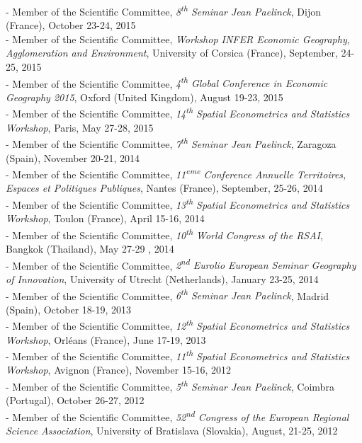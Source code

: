 \documentclass[a4paper,12pt]{article}
\begin{document}
- Member of the Scientific Committee, \textit{8\textsuperscript{th} Seminar Jean Paelinck}, Dijon (France), October 23-24, 2015 \\
- Member of the Scientific Committee, \textit{Workshop INFER Economic Geography, Agglomeration and Environment}, University of Corsica (France), September, 24-25, 2015 \\
- Member of the Scientific Committee, \textit{4\textsuperscript{th} Global Conference in Economic Geography 2015}, Oxford (United Kingdom), August 19-23, 2015 \\
- Member of the Scientific Committee, \textit{14\textsuperscript{th} Spatial Econometrics and Statistics Workshop}, Paris, May 27-28, 2015 \\
- Member of the Scientific Committee, \textit{7\textsuperscript{th} Seminar Jean Paelinck}, Zaragoza (Spain), November 20-21, 2014 \\
- Member of the Scientific Committee, \textit{11\textsuperscript{eme} Conference Annuelle Territoires, Espaces et Politiques Publiques}, Nantes (France), September, 25-26, 2014 \\
- Member of the Scientific Committee, \textit{13\textsuperscript{th} Spatial Econometrics and Statistics Workshop}, Toulon (France), April 15-16, 2014 \\
- Member of the Scientific Committee, \textit{10\textsuperscript{th} World Congress of the RSAI}, Bangkok (Thailand), May 27-29 , 2014\\
- Member of the Scientific Committee, \textit{2\textsuperscript{nd} Eurolio European Seminar Geography of Innovation}, University of Utrecht (Netherlands), January 23-25, 2014 \\
- Member of the Scientific Committee, \textit{6\textsuperscript{th} Seminar Jean Paelinck}, Madrid (Spain), October 18-19, 2013 \\
- Member of the Scientific Committee, \textit{12\textsuperscript{th} Spatial Econometrics and Statistics Workshop}, Orléans (France), June 17-19, 2013 \\
- Member of the Scientific Committee, \textit{11\textsuperscript{th} Spatial Econometrics and Statistics Workshop}, Avignon (France), November 15-16, 2012 \\
- Member of the Scientific Committee, \textit{5\textsuperscript{th} Seminar Jean Paelinck}, Coimbra (Portugal), October 26-27, 2012 \\
- Member of the Scientific Committee, \textit{52\textsuperscript{nd} Congress of the European Regional Science Association}, University of Bratislava (Slovakia), August, 21-25, 2012 \\
\end{document}
